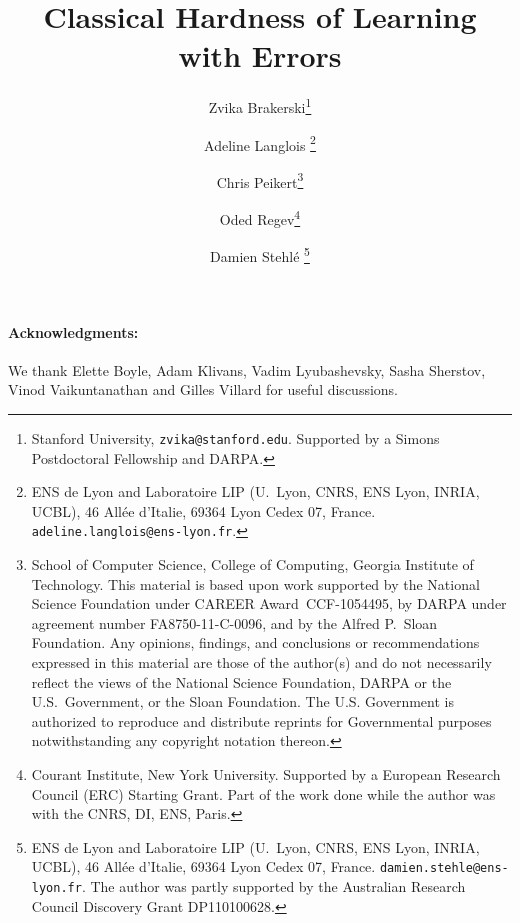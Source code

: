 \documentclass[letterpaper,11pt]{article}
\title{\bf Classical Hardness of Learning with Errors}
\date{}
\author{
Zvika Brakerski\thanks{Stanford University, \texttt{zvika@stanford.edu}. Supported by a Simons Postdoctoral Fellowship and DARPA.}
\and
Adeline Langlois
\thanks{ENS de Lyon and Laboratoire LIP (U.\ Lyon, CNRS, ENS Lyon, INRIA, UCBL),
    46 All\'ee d'Italie, 69364 Lyon Cedex 07, France. \texttt{adeline.langlois@ens-lyon.fr}.}
\and
%
Chris Peikert\thanks{School of Computer Science, College of
    Computing, Georgia Institute of Technology.
    This material is based upon work supported by the National Science
    Foundation under CAREER Award~CCF-1054495, by DARPA under
    agreement number FA8750-11-C-0096, and by the Alfred P.~Sloan
    Foundation.  Any opinions, findings, and conclusions or
    recommendations expressed in this material are those of the
    author(s) and do not necessarily reflect the views of the National
    Science Foundation, DARPA or the U.S.~Government, or the Sloan
    Foundation.  The U.S. Government is authorized to reproduce and
    distribute reprints for Governmental purposes notwithstanding any
    copyright notation thereon.}
%
  \and Oded Regev\thanks{Courant Institute, New York
    University. Supported by a European Research Council (ERC)
    Starting Grant. Part of the work done while the author was with
    the CNRS, DI, ENS, Paris.}
\and
%
Damien Stehl\'e \thanks{ENS de Lyon and Laboratoire LIP (U.\ Lyon,
  CNRS, ENS Lyon, INRIA, UCBL), 46 All\'ee d'Italie, 69364 Lyon Cedex
  07, France. \texttt{damien.stehle@ens-lyon.fr}.  The author was
  partly supported by the Australian Research Council Discovery Grant
  DP110100628.  }
}
\begin{document}
\maketitle

\begin{abstract}
  
\end{abstract}

\noteswarning





%

%







\paragraph{Acknowledgments:} We thank Elette Boyle, Adam Klivans, Vadim Lyubashevsky, Sasha Sherstov, Vinod Vaikuntanathan and Gilles Villard 
for useful discussions.





%
\end{document}

